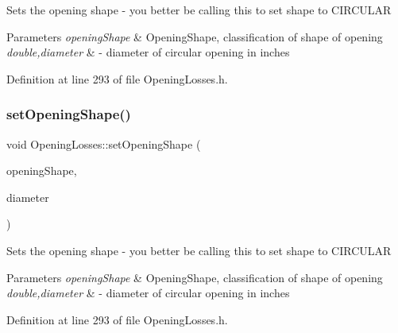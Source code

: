 Sets the opening shape -\/ you better be calling this to set shape to C\+I\+R\+C\+U\+L\+AR 
\begin{DoxyParams}{Parameters}
{\em opening\+Shape} & Opening\+Shape, classification of shape of opening \\
\hline
{\em double,diameter} & -\/ diameter of circular opening in inches \\
\hline
\end{DoxyParams}


Definition at line 293 of file Opening\+Losses.\+h.

\mbox{\label{class_opening_losses_afb0e0884b0e60db8cb6674228cf3aafe}} 
\subsubsection{\texorpdfstring{set\+Opening\+Shape()}{setOpeningShape()}\hspace{0.1cm}{\footnotesize\ttfamily [5/6]}}
{\footnotesize\ttfamily void Opening\+Losses\+::set\+Opening\+Shape (\begin{DoxyParamCaption}\item[{\hyperlink{class_opening_losses_a57f9759b6fd72a1b75aa885800e26157}{Opening\+Shape} const}]{opening\+Shape,  }\item[{const double}]{diameter }\end{DoxyParamCaption})\hspace{0.3cm}{\ttfamily [inline]}}

Sets the opening shape -\/ you better be calling this to set shape to C\+I\+R\+C\+U\+L\+AR 
\begin{DoxyParams}{Parameters}
{\em opening\+Shape} & Opening\+Shape, classification of shape of opening \\
\hline
{\em double,diameter} & -\/ diameter of circular opening in inches \\
\hline
\end{DoxyParams}


Definition at line 293 of file Opening\+Losses.\+h.

\mbox{\label{class_opening_losses_afb0e0884b0e60db8cb6674228cf3aafe}} 
